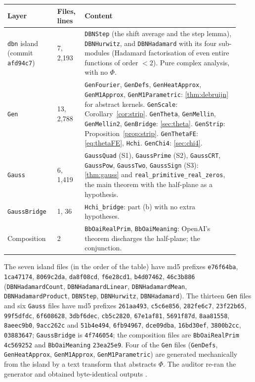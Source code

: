 \documentclass[11pt]{article}
\theoremstyle{definition}
\newcommand{\lean}[1]{\texttt{#1}}
\begin{document}
\begin{center}\small
\begin{tabular}{@{}P{0.2\linewidth}P{0.11\linewidth}P{0.62\linewidth}@{}}
\toprule
Layer & Files, lines & Content \\
\midrule
\lean{dbn} island \cite{Murphy932} (commit \lean{afd94c7}) & 7, 2{,}193 & \lean{DBNStep} (the shift average and the step lemma), \lean{DBNHurwitz}, and \lean{DBNHadamard} with its four sub-modules (Hadamard factorisation of even entire functions of order $<2$). Pure complex analysis, with no $\Phi$. \\
\lean{Gen} & 13, 2{,}788 & \lean{GenFourier}, \lean{GenDefs}, \lean{GenHeatApprox}, \lean{GenM1Approx}, \lean{GenM1Parametric}: \cref{thm:debruijn} for abstract kernels. \lean{GenScale}: Corollary~\ref{cor:strip}. \lean{GenTheta}, \lean{GenMellin}, \lean{GenMellin2}, \lean{GenBridge}: \cref{sec:theta}. \lean{GenStrip}: Proposition~\ref{prop:strip}. \lean{GenThetaFE}: \eqref{eq:thetaFE}, \lean{Hchi}. \lean{GenChi4}: \cref{sec:chi4}. \\
\lean{Gauss} & 6, 1{,}419 & \lean{GaussQuad} (S1), \lean{GaussPrime} (S2), \lean{GaussCRT}, \lean{GaussPow}, \lean{GaussTwo}, \lean{GaussSign} (S3): \cref{thm:gauss} and \lean{real\_\allowbreak{}primitive\_\allowbreak{}real\_\allowbreak{}zeros}, the main theorem with the half-plane as a hypothesis. \\
\lean{GaussBridge} & 1, 36 & \lean{Hchi\_\allowbreak{}bridge}: part (b) with no extra hypotheses. \\
Composition & 2 & \lean{BbOaiRealPrim}, \lean{BbOaiMeaning}: OpenAI's theorem discharges the half-plane; the conjunction. \\
\bottomrule
\end{tabular}
\end{center}

\noindent
The seven island files (in the order of the table) have md5 prefixes \lean{e76f64ba}, \lean{1ca47174}, \lean{8069c2da}, \lean{da8f08cd}, \lean{f6e28cd1}, \lean{b4d07462}, \lean{46c3b886} (\lean{DBNHadamardCount}, \lean{DBNHadamardLinear}, \lean{DBNHadamardMean}, \lean{DBNHadamardProduct}, \lean{DBNStep}, \lean{DBNHurwitz}, \lean{DBNHadamard}). The thirteen \lean{Gen} files and six \lean{Gauss} files have md5 prefixes
\lean{261aa493}, \lean{c5c6e856}, \lean{282fe6c7}, \lean{23f22b65}, \lean{99f5dfdc}, \lean{6f608628}, \lean{3dbf6dec}, \lean{cb5c2820}, \lean{67e1af81}, \lean{5691f87d}, \lean{8aa81558}, \lean{8aeec9b0}, \lean{9acc262c} and
\lean{51b4e494}, \lean{6fb94967}, \lean{dce09dba}, \lean{16bd30ef}, \lean{3800b2cc}, \lean{03883647};
\lean{GaussBridge} is \lean{4f746054}; the composition files are \lean{BbOaiRealPrim} \lean{4c569252} and \lean{BbOaiMeaning} \lean{23ea25e9}. Four of the \lean{Gen} files (\lean{GenDefs}, \lean{GenHeatApprox}, \lean{GenM1Approx}, \lean{GenM1Parametric}) are generated mechanically from the island by a text transform that abstracts $\Phi$. The auditor re-ran the generator and obtained byte-identical outputs \cite[REVIEW\_GEN\_D1\_D2a]{bbrecords}.
\end{document}
